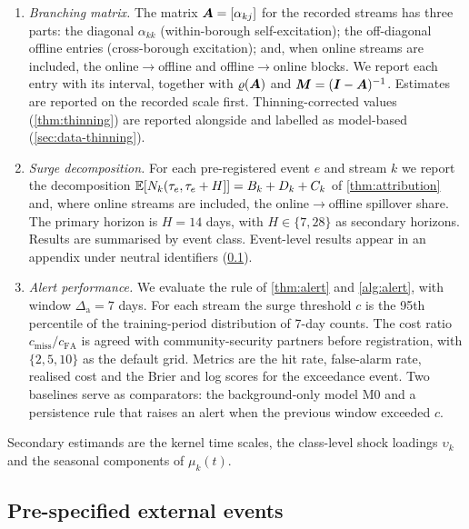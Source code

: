 \begin{enumerate}[E1.]
  \item \emph{Branching matrix.} The matrix $\bm{A}=[\alpha_{kj}]$ for the
  recorded streams has three parts: the diagonal $\alpha_{kk}$
  (within-borough self-excitation); the off-diagonal offline entries
  (cross-borough excitation); and, when online streams are included, the
  online$\to$offline and offline$\to$online blocks. We report each entry
  with its interval, together with $\varrho(\bm{A})$ and
  $\bm{M}=(\bm{I}-\bm{A})^{-1}$. Estimates are reported on the recorded scale
  first. Thinning-corrected values (\cref{thm:thinning}) are reported
  alongside and labelled as model-based (\cref{sec:data-thinning}).
  \item \emph{Surge decomposition.} For each pre-registered event $e$ and
  stream $k$ we report the decomposition $\mathbb{E}[N_k(\tau_e,\tau_e+H]] =
  B_k + D_k + C_k$ of \cref{thm:attribution} and, where online streams are
  included, the online$\to$offline spillover share. The primary horizon is
  $H=14$ days, with $H\in\{7,28\}$ as secondary horizons. Results are
  summarised by event class. Event-level results appear in an appendix under
  neutral identifiers (\cref{sec:plan-events}).
  \item \emph{Alert performance.} We evaluate the rule of \cref{thm:alert}
  and \cref{alg:alert}, with window $\Delta_{\mathrm a}=7$ days. For each stream the
  surge threshold $c$ is the 95th percentile of the training-period
  distribution of 7-day counts. The cost ratio $c_{\mathrm{miss}}/c_{\mathrm{FA}}$
  is agreed with community-security partners before registration, with
  $\{2,5,10\}$ as the default grid. Metrics are the hit rate, false-alarm
  rate, realised cost and the Brier and log scores for the exceedance event.
  Two baselines serve as comparators: the background-only model M0 and a
  persistence rule that raises an alert when the previous window exceeded
  $c$.
\end{enumerate}
Secondary estimands are the kernel time scales, the class-level shock
loadings $\upsilon_k$ and the seasonal components of $\mu_k(t)$.

\subsection{Pre-specified external events}\label{sec:plan-events}

